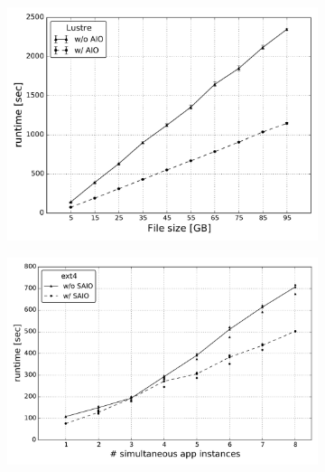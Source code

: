 \begin{figure}[!htb]
\begin{subfigure}[t]{0.32\textwidth}
    \centering
    \includegraphics[width=\textwidth]{chapters/chapter2/figures/SC2015/ROOT/separate_plots/test_cluster/Lustre/runtime}
    \caption{\textit{}}
    \label{figure: lustre_1}
  \end{subfigure}
  \begin{subfigure}[b]{0.32\textwidth}
    \centering
    \includegraphics[width=\textwidth]{chapters/chapter2/figures/SC2015/ROOT/cluster/multiple_instances/simult_instance_ext4_test_cluster}
    \caption{\textit{}}
    \label{figure: ext4_2}
  \end{subfigure}
  \begin{subfigure}[b]{0.32\textwidth}
    \centering

\end{subfigure}
\end{figure}
